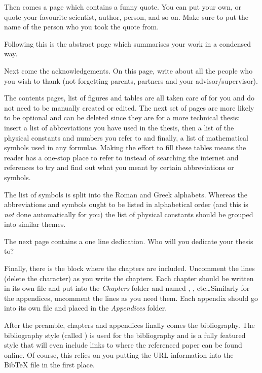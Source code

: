 Then comes a page which contains a funny quote. You can put your own, or quote your favourite scientist, author, person, and so on. Make sure to put the name of the person who you took the quote from.

Following this is the abstract page which summarises your work in a condensed way.

Next come the acknowledgements. On this page, write about all the people who you wish to thank (not forgetting parents, partners and your advisor/supervisor).

The contents pages, list of figures and tables are all taken care of for you and do not need to be manually created or edited. The next set of pages are more likely to be optional and can be deleted since they are for a more technical thesis: insert a list of abbreviations you have used in the thesis, then a list of the physical constants and numbers you refer to and finally, a list of mathematical symbols used in any formulae. Making the effort to fill these tables means the reader has a one-stop place to refer to instead of searching the internet and references to try and find out what you meant by certain abbreviations or symbols.

The list of symbols is split into the Roman and Greek alphabets. Whereas the abbreviations and symbols ought to be listed in alphabetical order (and this is \emph{not} done automatically for you) the list of physical constants should be grouped into similar themes.

The next page contains a one line dedication. Who will you dedicate your thesis to?

Finally, there is the block where the chapters are included. Uncomment the lines (delete the \code{\%} character) as you write the chapters. Each chapter should be written in its own file and put into the \emph{Chapters} folder and named , , etc\ldots Similarly for the appendices, uncomment the lines as you need them. Each appendix should go into its own file and placed in the \emph{Appendices} folder.

After the preamble, chapters and appendices finally comes the bibliography. The bibliography style (called ) is used for the bibliography and is a fully featured style that will even include links to where the referenced paper can be found online. Of course, this relies on you putting the URL information into the BibTeX file in the first place.


